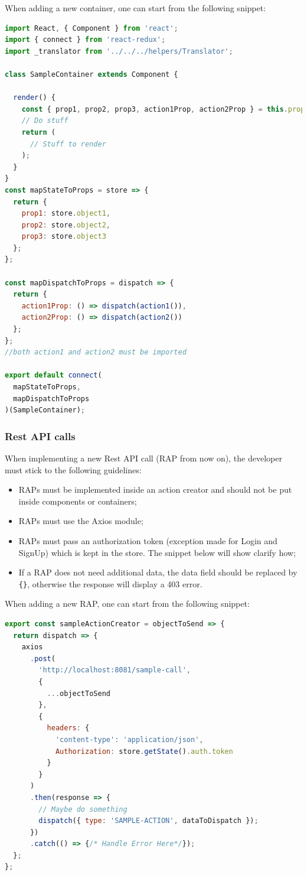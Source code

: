 When adding a new container, one can start from the following snippet:
\begin{lstlisting}[language=JavaScript, frame=single]
import React, { Component } from 'react';
import { connect } from 'react-redux';
import _translator from '../../../helpers/Translator';

class SampleContainer extends Component {

  render() {
    const { prop1, prop2, prop3, action1Prop, action2Prop } = this.props;
    // Do stuff
    return (
      // Stuff to render
    );
  }
}
const mapStateToProps = store => {
  return {
    prop1: store.object1,
    prop2: store.object2,
    prop3: store.object3
  };
};

const mapDispatchToProps = dispatch => {
  return {
    action1Prop: () => dispatch(action1()),
    action2Prop: () => dispatch(action2())
  };
};
//both action1 and action2 must be imported

export default connect(
  mapStateToProps,
  mapDispatchToProps
)(SampleContainer);
\end{lstlisting}


\subsubsection{Rest API calls}
When implementing a new Rest API call (RAP from now on), the developer must stick to the following guidelines:
\begin{itemize}
	\item RAPs must be implemented inside an action creator and should not be put inside components or containers;
	\item RAPs must use the Axios module;
	\item RAPs must pass an authorization token (exception made for Login and SignUp) which is kept in the store. The snippet below will show clarify how;
	\item If a RAP does not need additional data, the data field should be replaced by \texttt{\{\}}, otherwise the response will display a 403 error.
\end{itemize}
When adding a new RAP, one can start from the following snippet:
\begin{lstlisting}[language=JavaScript, frame=single]
export const sampleActionCreator = objectToSend => {
  return dispatch => {
    axios
      .post(
        'http://localhost:8081/sample-call',
        {
          ...objectToSend
        },
        {
          headers: {
            'content-type': 'application/json',
            Authorization: store.getState().auth.token
          }
        }
      )
      .then(response => {
        // Maybe do something
        dispatch({ type: 'SAMPLE-ACTION', dataToDispatch });
      })
      .catch(() => {/* Handle Error Here*/});
  };
};
\end{lstlisting}


